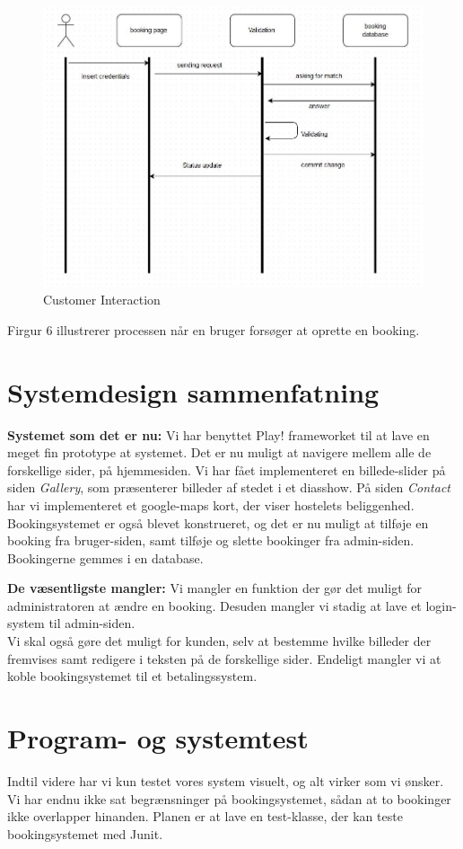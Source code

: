 \documentclass[12pt,a4paper]{article}
\begin{document}
\begin{figure}[H]
\centering
\includegraphics[scale=0.6]{customerLog-in.jpg}
\caption{Customer Interaction}
\end{figure}
Firgur 6 illustrerer processen når en bruger forsøger at oprette en booking.
\newpage
\section{Systemdesign sammenfatning}
\textbf{Systemet som det er nu:}
Vi har benyttet Play! frameworket til at lave en meget fin prototype at systemet.
Det er nu muligt at navigere mellem alle de forskellige sider, på hjemmesiden. Vi har fået implementeret en billede-slider på siden \textit{Gallery}, som præsenterer billeder af stedet i et diasshow. På siden \textit{Contact} har vi implementeret et google-maps kort, der viser hostelets beliggenhed. Bookingsystemet er også blevet konstrueret, og det er nu muligt at tilføje en booking fra bruger-siden, samt tilføje og slette bookinger fra admin-siden. Bookingerne gemmes i en database.    

\textbf{De væsentligste mangler:}
Vi mangler en funktion der gør det muligt for administratoren at ændre en booking. Desuden mangler vi stadig at lave et login-system til admin-siden.\\
Vi skal også gøre det muligt for kunden, selv at bestemme hvilke billeder der fremvises samt redigere i teksten på de forskellige sider. Endeligt mangler vi at koble bookingsystemet til et betalingssystem.
\section{Program- og systemtest}
Indtil videre har vi kun testet vores system visuelt, og alt virker som vi ønsker. Vi har endnu ikke sat begrænsninger på bookingsystemet, sådan at to bookinger ikke overlapper hinanden. Planen er at lave en test-klasse, der kan teste bookingsystemet med Junit.
\end{document}
